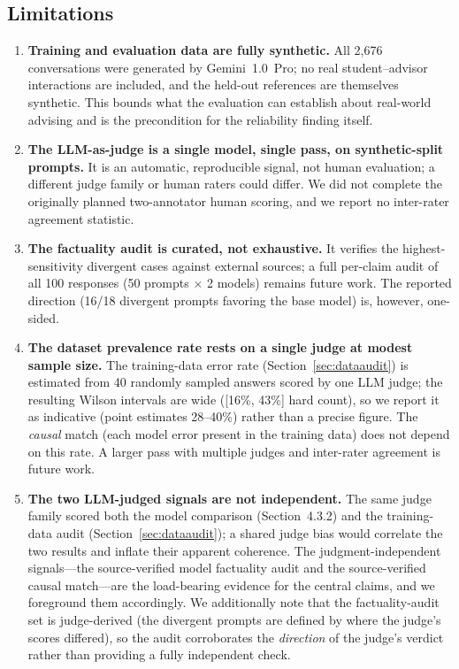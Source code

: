 \documentclass[11pt, a4paper]{article}
\begin{document}
\subsection{Limitations}
\begin{enumerate}
    \item \textbf{Training and evaluation data are fully synthetic.} All 2{,}676 conversations were generated by Gemini~1.0~Pro; no real student--advisor interactions are included, and the held-out references are themselves synthetic. This bounds what the evaluation can establish about real-world advising and is the precondition for the reliability finding itself.
    \item \textbf{The LLM-as-judge is a single model, single pass, on synthetic-split prompts.} It is an automatic, reproducible signal, not human evaluation; a different judge family or human raters could differ. We did not complete the originally planned two-annotator human scoring, and we report no inter-rater agreement statistic.
    \item \textbf{The factuality audit is curated, not exhaustive.} It verifies the highest-sensitivity divergent cases against external sources; a full per-claim audit of all 100 responses (50 prompts $\times$ 2 models) remains future work. The reported direction (16/18 divergent prompts favoring the base model) is, however, one-sided.
    \item \textbf{The dataset prevalence rate rests on a single judge at modest sample size.} The training-data error rate (Section~\ref{sec:dataaudit}) is estimated from 40 randomly sampled answers scored by one LLM judge; the resulting Wilson intervals are wide ([16\%, 43\%] hard count), so we report it as indicative (point estimates 28--40\%) rather than a precise figure. The \emph{causal} match (each model error present in the training data) does not depend on this rate. A larger pass with multiple judges and inter-rater agreement is future work.
    \item \textbf{The two LLM-judged signals are not independent.} The same judge family scored both the model comparison (Section~4.3.2) and the training-data audit (Section~\ref{sec:dataaudit}); a shared judge bias would correlate the two results and inflate their apparent coherence. The judgment-independent signals---the source-verified model factuality audit and the source-verified causal match---are the load-bearing evidence for the central claims, and we foreground them accordingly. We additionally note that the factuality-audit set is judge-derived (the divergent prompts are defined by where the judge's scores differed), so the audit corroborates the \emph{direction} of the judge's verdict rather than providing a fully independent check.

\end{enumerate}
\end{document}
